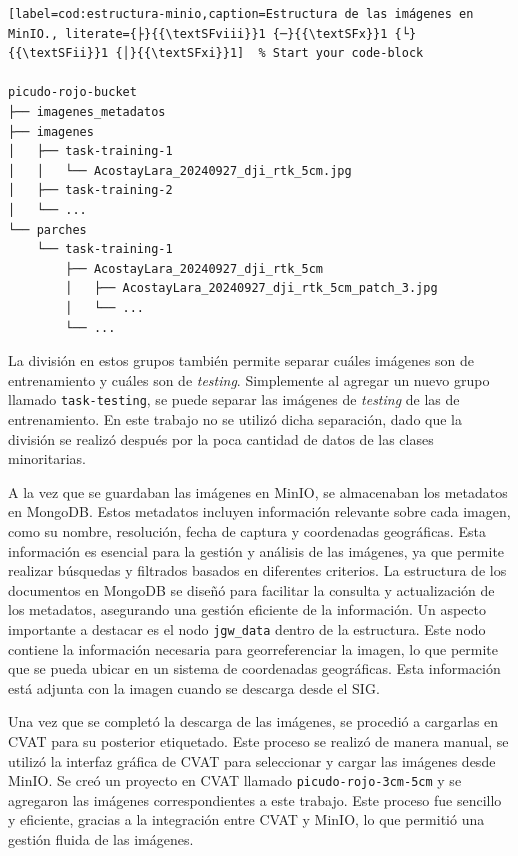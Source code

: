 \begin{lstlisting}[label=cod:estructura-minio,caption=Estructura de las imágenes en MinIO., literate={├}{{\textSFviii}}1 {─}{{\textSFx}}1 {└}{{\textSFii}}1 {│}{{\textSFxi}}1]  % Start your code-block

picudo-rojo-bucket
├── imagenes_metadatos
├── imagenes
│   ├── task-training-1
│   │   └── AcostayLara_20240927_dji_rtk_5cm.jpg
│   ├── task-training-2
│   └── ...
└── parches
    └── task-training-1
        ├── AcostayLara_20240927_dji_rtk_5cm
        │   ├── AcostayLara_20240927_dji_rtk_5cm_patch_3.jpg
        │   └── ...
        └── ...

\end{lstlisting}

La división en estos grupos también permite separar cuáles imágenes son de entrenamiento y cuáles son de \textit{testing}. Simplemente al agregar un nuevo grupo llamado \texttt{task-testing}, se puede separar las imágenes de \textit{testing} de las de entrenamiento. En este trabajo no se utilizó dicha separación, dado que la división se realizó después por la poca cantidad de datos de las clases minoritarias.

A la vez que se guardaban las imágenes en MinIO, se almacenaban los metadatos en MongoDB. Estos metadatos incluyen información relevante sobre cada imagen, como su nombre, resolución, fecha de captura y coordenadas geográficas. Esta información es esencial para la gestión y análisis de las imágenes, ya que permite realizar búsquedas y filtrados basados en diferentes criterios. La estructura de los documentos en MongoDB se diseñó para facilitar la consulta y actualización de los metadatos, asegurando una gestión eficiente de la información. Un aspecto importante a destacar es el nodo \texttt{jgw\_data} dentro de la estructura. Este nodo contiene la información necesaria para georreferenciar la imagen, lo que permite que se pueda ubicar en un sistema de coordenadas geográficas. Esta información está adjunta con la imagen cuando se descarga desde el SIG.

Una vez que se completó la descarga de las imágenes, se procedió a cargarlas en CVAT para su posterior etiquetado. Este proceso se realizó de manera manual, se utilizó la interfaz gráfica de CVAT para seleccionar y cargar las imágenes desde MinIO. Se creó un proyecto en CVAT llamado \texttt{picudo-rojo-3cm-5cm} y se agregaron las imágenes correspondientes a este trabajo. Este proceso fue sencillo y eficiente, gracias a la integración entre CVAT y MinIO, lo que permitió una gestión fluida de las imágenes.

